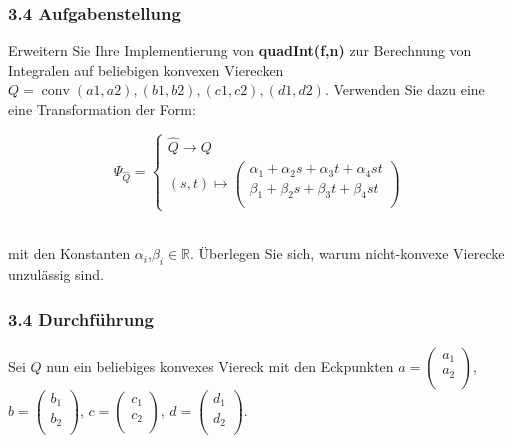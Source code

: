 \documentclass[a4paper,11pt,bibliography=totoc,listof=totoc,headinclude=true,cleardoublepage=empty,oneside]{scrbook}
\DeclareMathOperator*{\conv}{conv}
\begin{document}
\subsubsection{3.4 Aufgabenstellung} 
Erweitern Sie Ihre Implementierung von \textbf{quadInt(f,n)} zur Berechnung von Integralen auf beliebigen konvexen Vierecken $ Q=\conv{(a1,a2),(b1,b2),(c1,c2),(d1,d2)} $. Verwenden Sie dazu eine eine Transformation der Form:

\begin{equation*} 
\Psi_{\hat{Q}} = \begin{cases} 
\hat{Q} \to Q \\
(s,t) \mapsto

\left(
\begin{array}{ccc}
\alpha_1 + \alpha_{2}s + \alpha_{3}t +\alpha_{4}st \\
\beta_1+\beta_{2}s+\beta_{3}t+\beta_{4}st \\
\end{array}
\right)

\end{cases} 
\end{equation*} \\

\color{change2}
\begin{flushleft}		mit den Konstanten $\alpha_i$,$\beta_i \in \mathbb{R}$. Überlegen Sie sich, warum nicht-konvexe Vierecke unzulässig sind.\end{flushleft} 
\vspace*{3mm}

\subsubsection{3.4 Durchführung}

Sei $Q$ nun ein beliebiges konvexes Viereck mit den Eckpunkten $a=\left(\begin{array}{ccc}
a_1 \\
a_2\\
\end{array}\right)$, 
$b=\left(\begin{array}{ccc}
b_1 \\
b_2\\
\end{array}\right)$,
$c=\left(\begin{array}{ccc}
c_1 \\
c_2\\
\end{array}\right)$,
$d=\left(\begin{array}{ccc}
d_1 \\
d_2\\
\end{array}\right)$.
\end{document}

